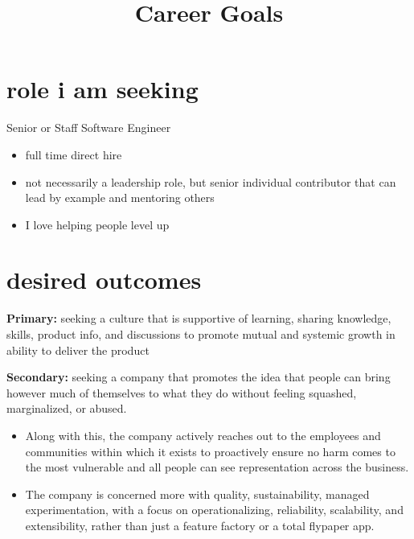 \documentclass[14pt,letterpaper,sans]{moderncv} %
\title{Career Goals}
\begin{document}


\clearpage


\makecvtitle

\section{role i am seeking}

Senior or Staff Software Engineer
\begin{itemize}
\item
  full time direct hire
\item
  not necessarily a leadership role, but senior individual contributor that can lead by example and mentoring others
\item
  I love helping people level up
\end{itemize}

\hypertarget{desired-outcomes}{%
\section{desired outcomes}\label{desired-outcomes}}

\textbf{Primary:} seeking a culture that is supportive of learning, sharing knowledge, skills, product info, and discussions to promote mutual and systemic growth in ability to deliver the product

\textbf{Secondary:} seeking a company that promotes the idea that people can bring however much of themselves to what they do without feeling squashed, marginalized, or abused.

\begin{itemize}
\item
  Along with this, the company actively reaches out to the employees and communities within which it exists to proactively ensure no harm comes to the most vulnerable and all people can see representation across the business.
\item
  The company is concerned more with quality, sustainability, managed experimentation, with a focus on operationalizing, reliability, scalability, and extensibility, rather than just a feature factory or a total flypaper app.
\end{itemize}
\end{document}
